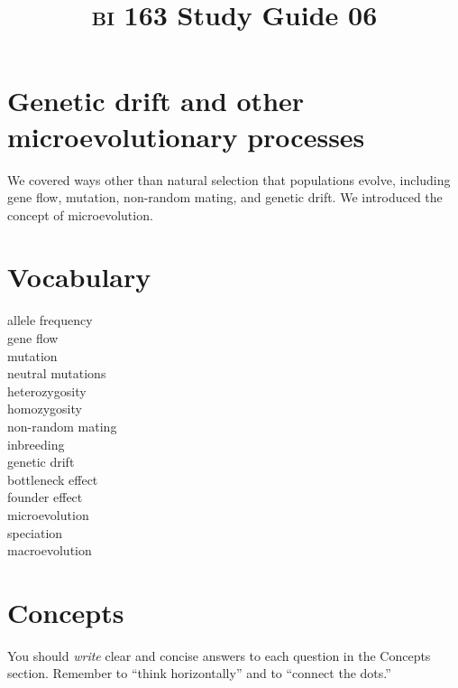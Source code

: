 \documentclass[letterpaper]{tufte-handout}
\title{{\scshape bi} 163 Study Guide 06}
\date{} %
\begin{document}
\maketitle	%

\section*{Genetic drift and other microevolutionary processes}

We covered ways other than natural selection that populations evolve, including gene flow, mutation, non-random mating, and genetic drift. We introduced the concept of microevolution.

\section*{Vocabulary}

\vspace{-1\baselineskip}
\begin{multicols}{2}
allele frequency \\
gene flow \\
mutation \\
neutral mutations \\
heterozygosity \\
homozygosity \\
non-random mating \\
inbreeding \\
genetic drift \\
bottleneck effect \\
founder effect \\
microevolution \\
speciation \\
macroevolution

\end{multicols}

\section*{Concepts}

You should \emph{write} clear and concise answers to each question in the Concepts section.  Remember to ``think horizontally'' and to ``connect the dots.'' 
\end{document}
